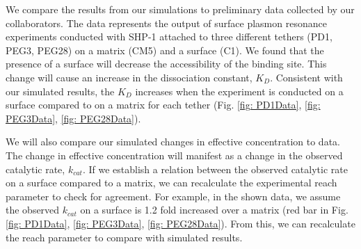 \documentclass[../../AdvancementSummary.tex]{subfiles}
\begin{document}

We compare the results from our simulations to preliminary data collected by our collaborators. The data represents the output of surface plasmon resonance experiments conducted with SHP-1 attached to three different tethers (PD1, PEG3, PEG28) on a matrix (CM5) and a surface (C1). 
We found that the presence of a surface will decrease the accessibility of the binding site. This change will cause an increase in the dissociation constant, $K_D$. 
Consistent with our simulated results, the $K_D$ increases when the experiment is conducted on a surface compared to on a matrix for each tether (Fig. \ref{fig: PD1Data}, \ref{fig: PEG3Data}, \ref{fig: PEG28Data}).

We will also compare our simulated changes in effective concentration to data. The change in effective concentration will manifest as a change in the observed catalytic rate, $k_{cat}$. 
If we establish a relation between the observed catalytic rate on a surface compared to a matrix, we can recalculate the experimental reach parameter to check for agreement. For example, in the shown data, we assume the observed $k_{cat}$ on a surface is 1.2 fold increased over a matrix (red bar in Fig. \ref{fig: PD1Data}, \ref{fig: PEG3Data}, \ref{fig: PEG28Data}). From this, we can recalculate the reach parameter to compare with simulated results. 
\end{document}

